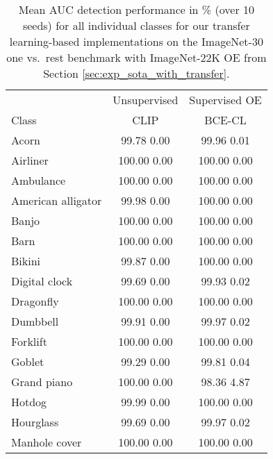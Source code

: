 \documentclass[10pt]{article} \usepackage[accepted]{stylefiles/tmlr}
\begin{document}
\begin{table*}[th]
    \caption{Mean AUC detection performance in \% (over 10 seeds) for all individual classes for our transfer learning-based implementations on the ImageNet-30 one vs.~rest benchmark with ImageNet-22K OE from Section \ref{sec:exp_sota_with_transfer}. }
    \label{tab:imagenet_classes_transfer}
    \vspace{0.5em}
    \centering\small
    \begin{tabular}{lcc} 
\toprule 
 & \multicolumn{1}{c|}{Unsupervised} & \multicolumn{1}{c}{Supervised OE} \\ 
Class & \multicolumn{1}{c|}{CLIP} & \multicolumn{1}{c}{BCE-CL} \\ 
\midrule 
Acorn & \multicolumn{1}{c|}{99.78  0.00} & \multicolumn{1}{c}{99.96  0.01} \\ 
Airliner & \multicolumn{1}{c|}{100.00  0.00} & \multicolumn{1}{c}{100.00  0.00} \\ 
Ambulance & \multicolumn{1}{c|}{100.00  0.00} & \multicolumn{1}{c}{100.00  0.00} \\ 
American alligator & \multicolumn{1}{c|}{99.98  0.00} & \multicolumn{1}{c}{100.00  0.00} \\ 
Banjo & \multicolumn{1}{c|}{100.00  0.00} & \multicolumn{1}{c}{100.00  0.00} \\ 
Barn & \multicolumn{1}{c|}{100.00  0.00} & \multicolumn{1}{c}{100.00  0.00} \\ 
Bikini & \multicolumn{1}{c|}{99.87  0.00} & \multicolumn{1}{c}{100.00  0.00} \\ 
Digital clock & \multicolumn{1}{c|}{99.69  0.00} & \multicolumn{1}{c}{99.93  0.02} \\ 
Dragonfly & \multicolumn{1}{c|}{100.00  0.00} & \multicolumn{1}{c}{100.00  0.00} \\ 
Dumbbell & \multicolumn{1}{c|}{99.91  0.00} & \multicolumn{1}{c}{99.97  0.02} \\ 
Forklift & \multicolumn{1}{c|}{100.00  0.00} & \multicolumn{1}{c}{100.00  0.00} \\ 
Goblet & \multicolumn{1}{c|}{99.29  0.00} & \multicolumn{1}{c}{99.81  0.04} \\ 
Grand piano & \multicolumn{1}{c|}{100.00  0.00} & \multicolumn{1}{c}{98.36  4.87} \\ 
Hotdog & \multicolumn{1}{c|}{99.99  0.00} & \multicolumn{1}{c}{100.00  0.00} \\ 
Hourglass & \multicolumn{1}{c|}{99.69  0.00} & \multicolumn{1}{c}{99.97  0.02} \\ 
Manhole cover & \multicolumn{1}{c|}{100.00  0.00} & \multicolumn{1}{c}{100.00  0.00} \\ 

\end{tabular}
\end{table*}
\end{document}
